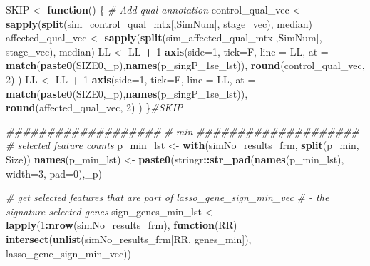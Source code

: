 \documentclass[
]{book}
\newenvironment{Shaded}{\begin{snugshade}}{\end{snugshade}}
\newcommand{\CommentTok}[1]{\textcolor[rgb]{0.56,0.35,0.01}{\textit{#1}}}
\newcommand{\ControlFlowTok}[1]{\textcolor[rgb]{0.13,0.29,0.53}{\textbf{#1}}}
\newcommand{\DataTypeTok}[1]{\textcolor[rgb]{0.13,0.29,0.53}{#1}}
\newcommand{\DecValTok}[1]{\textcolor[rgb]{0.00,0.00,0.81}{#1}}
\newcommand{\KeywordTok}[1]{\textcolor[rgb]{0.13,0.29,0.53}{\textbf{#1}}}
\newcommand{\NormalTok}[1]{#1}
\newcommand{\OperatorTok}[1]{\textcolor[rgb]{0.81,0.36,0.00}{\textbf{#1}}}
\newcommand{\StringTok}[1]{\textcolor[rgb]{0.31,0.60,0.02}{#1}}
\begin{document}
\begin{Shaded}
\begin{Highlighting}[]
\NormalTok{SKIP  <{-}}\StringTok{ }\ControlFlowTok{function}\NormalTok{() \{}
\CommentTok{\# Add qual annotation}
\NormalTok{control\_qual\_vec <{-}}\StringTok{ }\KeywordTok{sapply}\NormalTok{(}\KeywordTok{split}\NormalTok{(sim\_control\_qual\_mtx[,SimNum], stage\_vec), median)}
\NormalTok{affected\_qual\_vec <{-}}\StringTok{ }\KeywordTok{sapply}\NormalTok{(}\KeywordTok{split}\NormalTok{(sim\_affected\_qual\_mtx[,SimNum], stage\_vec), median)}
\NormalTok{LL <{-}}\StringTok{ }\NormalTok{LL }\OperatorTok{+}\StringTok{ }\DecValTok{1}
\KeywordTok{axis}\NormalTok{(}\DataTypeTok{side=}\DecValTok{1}\NormalTok{, }\DataTypeTok{tick=}\NormalTok{F, }\DataTypeTok{line =}\NormalTok{ LL,}
  \DataTypeTok{at =}  \KeywordTok{match}\NormalTok{(}\KeywordTok{paste0}\NormalTok{(SIZE0,}\StringTok{\textquotesingle{}\_p\textquotesingle{}}\NormalTok{),}\KeywordTok{names}\NormalTok{(p\_singP\_1se\_lst)),}
  \KeywordTok{round}\NormalTok{(control\_qual\_vec, }\DecValTok{2}\NormalTok{)}
\NormalTok{ )}
\NormalTok{LL <{-}}\StringTok{ }\NormalTok{LL }\OperatorTok{+}\StringTok{ }\DecValTok{1}
\KeywordTok{axis}\NormalTok{(}\DataTypeTok{side=}\DecValTok{1}\NormalTok{, }\DataTypeTok{tick=}\NormalTok{F, }\DataTypeTok{line =}\NormalTok{ LL,}
  \DataTypeTok{at =}  \KeywordTok{match}\NormalTok{(}\KeywordTok{paste0}\NormalTok{(SIZE0,}\StringTok{\textquotesingle{}\_p\textquotesingle{}}\NormalTok{),}\KeywordTok{names}\NormalTok{(p\_singP\_1se\_lst)),}
  \KeywordTok{round}\NormalTok{(affected\_qual\_vec, }\DecValTok{2}\NormalTok{)}
\NormalTok{ )}
\NormalTok{\}}\CommentTok{\#SKIP}

\CommentTok{\#\#\#\#\#\#\#\#\#\#\#\#\#\#\#\#\#\#\#}
\CommentTok{\# min}
\CommentTok{\#\#\#\#\#\#\#\#\#\#\#\#\#\#\#\#\#\#\#\#}
\CommentTok{\# selected feature counts}
\NormalTok{p\_min\_lst <{-}}\StringTok{ }\KeywordTok{with}\NormalTok{(simNo\_results\_frm,}
 \KeywordTok{split}\NormalTok{(p\_min, Size))}
\KeywordTok{names}\NormalTok{(p\_min\_lst) <{-}}\StringTok{ }\KeywordTok{paste0}\NormalTok{(stringr}\OperatorTok{::}\KeywordTok{str\_pad}\NormalTok{(}\KeywordTok{names}\NormalTok{(p\_min\_lst), }\DataTypeTok{width=}\DecValTok{3}\NormalTok{, }\DataTypeTok{pad=}\StringTok{\textquotesingle{}0\textquotesingle{}}\NormalTok{),}\StringTok{\textquotesingle{}\_p\textquotesingle{}}\NormalTok{)}

\CommentTok{\# get selected features that are part of lasso\_gene\_sign\_min\_vec}
\CommentTok{\# {-} the signature selected genes}
\NormalTok{sign\_genes\_min\_lst <{-}}\StringTok{ }\KeywordTok{lapply}\NormalTok{(}\DecValTok{1}\OperatorTok{:}\KeywordTok{nrow}\NormalTok{(simNo\_results\_frm), }\ControlFlowTok{function}\NormalTok{(RR)}
    \KeywordTok{intersect}\NormalTok{(}\KeywordTok{unlist}\NormalTok{(simNo\_results\_frm[RR, }\StringTok{\textquotesingle{}genes\_min\textquotesingle{}}\NormalTok{]), lasso\_gene\_sign\_min\_vec))}


\end{Highlighting}
\end{Shaded}
\end{document}
